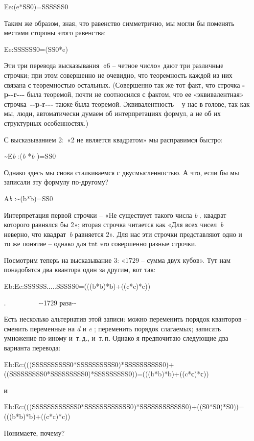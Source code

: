 \documentclass[../main.tex]{subfiles}
\begin{document}
Ee:(e*SS0)=SSSSSS0

Таким же образом, зная, что равенство симметрично, мы могли бы поменять местами стороны этого равенства:

Ee:SSSSSS0=(SS0*e)

Эти три перевода высказывания~«6 \--- четное число» дают три различные строчки; при этом совершенно не очевидно, что теоремность каждой из них связана с теоремностью остальных. (Совершенно так же тот факт, что строчка \textbf{-p-{}-r-{}-{}-} была теоремой, почти не соотносился с фактом, что ее «эквивалентная» строчка~\textbf{-{}-p-r-{}-{}-} также была теоремой. Эквивалентность \--- у нас в голове, так как мы, люди, автоматически думаем об интерпретациях формул, а не об их структурных особенностях.)

С высказыванием 2:~«2 не является квадратом» мы расправимся быстро:

\textasciitilde E\emph{b} :(\emph{b} *\emph{b} )=SS0

Однако здесь мы снова сталкиваемся с двусмысленностью. А что, если бы мы записали эту формулу по-другому?

A\emph{b} :\textasciitilde(b*b)=SS0

Интерпретация первой строчки \--- «Не существует такого числа \emph{b} , квадрат которого равнялся бы 2»; вторая строчка читается как «Для всех чисел~\emph{b} неверно, что квадрат~\emph{b} равняется 2». Для нас эти строчки представляют одно и то же понятие \--- однако для \acs{tnt} это совершенно разные строчки.

Посмотрим теперь на высказывание 3: «1729 \--- сумма двух кубов». Тут нам понадобятся два квантора один за другим, вот так:

Eb:Ec:SSSSSS.....SSSSS0=(((b*b)*b)+((c*c)*c))

.~~~~~~~~~ \textbar-{}-1729 раза-{}-\textbar{}

Есть несколько альтернатив этой записи: можно переменить порядок кванторов \--- сменить переменные на \emph{d} и \emph{e} ; переменить порядок слагаемых; записать умножение по-иному и~т.\,д., и~т.\,п. Однако я предпочитаю следующие два варианта перевода:

Eb:Ec:(((SSSSSSSSSS0*SSSSSSSSSS0)*SSSSSSSSSS0)+((SSSSSSSSS0*SSSSSSSSS0)*SSSSSSSSS0))=(((b*b)*b)+((c*с)*с))

и

Eb:Ec:(((SSSSSSSSSSSS0*SSSSSSSSSSSS0)*SSSSSSSSSSSS0)+((S0*S0)*S0))=(((b*b)*b)+((c*c)*c))

Понимаете, почему?
\end{document}
